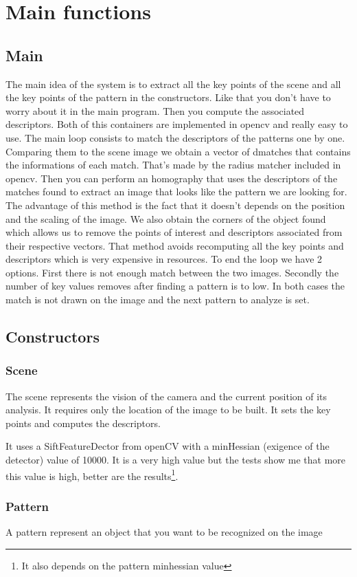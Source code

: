 \documentclass[english,a4paper,11pt]{report}
\begin{document}
\chapter{Main functions}

\section{Main}
 The main idea of the system is to extract all the key points of the scene and all the key points of the pattern in the constructors. Like that you don't have to worry about it in the main program. 
Then you compute the associated descriptors. Both of this containers are implemented in opencv and really easy to use. 
The main loop consists to match the descriptors of the patterns one by one. Comparing them to the scene image we obtain a vector of dmatches that contains the informations of each match. That's made by the radius matcher included in opencv. 
Then you can perform an homography  that uses the descriptors of the matches found to extract an image that looks like the pattern we are looking for. The advantage of this method is the fact that it doesn't depends on the position and the scaling of the image. We also obtain the corners of the object found which allows us to remove the points of interest and descriptors associated from their respective vectors. That method avoids recomputing all the key points and descriptors which is very expensive in resources. 
To end the loop we have 2 options. First there is not enough match between the two images. Secondly the number of key values removes after finding a pattern is to low. In both cases the match is not drawn on the image and the next pattern to analyze is set.
\section{Constructors}
\subsection{Scene}
\par The scene represents the vision of the camera and the current position of its analysis. 
It requires only the location of the image to be built. It sets the key points and computes the descriptors. 
\par It uses a SiftFeatureDector from openCV with a minHessian (exigence of the detector) value of 10000. It is a very high value but the tests show me that more this value is high, better are the results\footnote{It also depends on the pattern minhessian value}.
\subsection{Pattern}
A pattern represent an object that you want to be recognized on the image

{}

\end{document}
